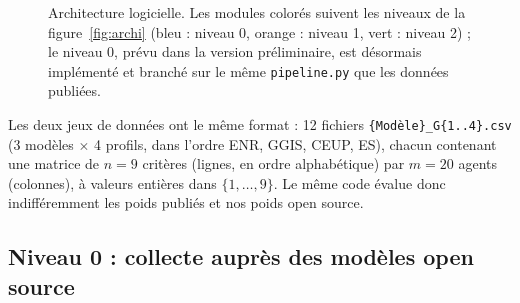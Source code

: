 \documentclass[11pt,a4paper]{article}
\newcommand{\Wbar}{\bar{W}}
\newcommand{\code}[1]{\texttt{#1}}
\begin{document}
\begin{figure}[htbp]
\caption{Architecture logicielle. Les modules colorés suivent les niveaux de la figure~\ref{fig:archi} (bleu : niveau 0, orange : niveau 1, vert : niveau 2) ; le niveau 0, prévu dans la version préliminaire, est désormais implémenté et branché sur le même \code{pipeline.py} que les données publiées.}
\label{fig:logiciel}
\end{figure}

Les deux jeux de données ont le même format : 12 fichiers \code{\{Modèle\}\_G\{1..4\}.csv} (3 modèles $\times$ 4 profils, dans l'ordre ENR, GGIS, CEUP, ES), chacun contenant une matrice de $n=9$ critères (lignes, en ordre alphabétique) par $m=20$ agents (colonnes), à valeurs entières dans $\{1,\dots,9\}$. Le même code évalue donc indifféremment les poids publiés et nos poids open source.

\subsection{Niveau 0 : collecte auprès des modèles open source}\label{sec:impl-n0}
\end{document}
